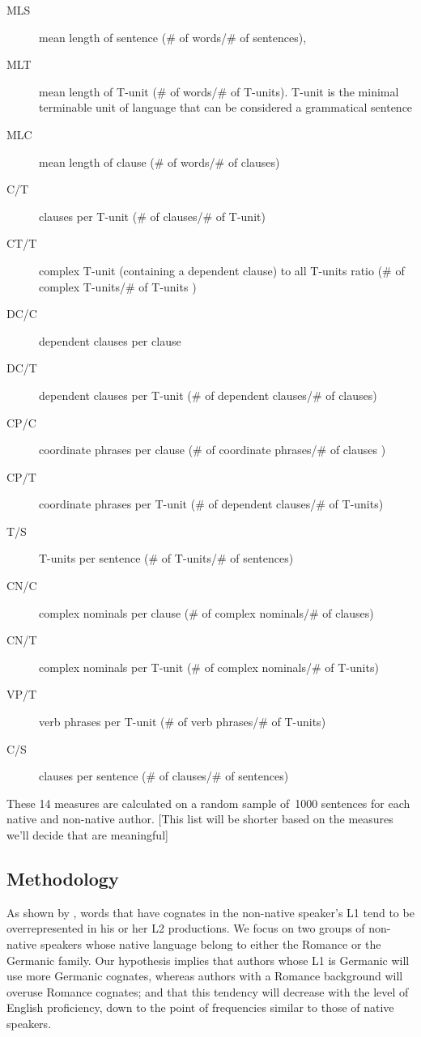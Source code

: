 \documentclass[11pt]{article}
\begin{document}
\begin{description}
\item[MLS] mean length of sentence (\# of words/\# of sentences), 
\item[MLT] mean length of T-unit (\# of words/\# of T-units). T-unit is the minimal terminable unit of language that can be considered a grammatical sentence 
\item[MLC] mean length of clause (\# of words/\# of clauses)
\item[C/T] clauses per T-unit (\# of clauses/\# of T-unit)
\item[CT/T] complex T-unit (containing a dependent clause) to all T-units ratio (\# of complex T-units/\# of T-units )
\item[DC/C] dependent clauses per clause
\item[DC/T] dependent clauses per T-unit (\# of dependent clauses/\# of clauses)
\item[CP/C] coordinate phrases per clause (\# of coordinate phrases/\# of clauses )
\item[CP/T] coordinate phrases per T-unit (\# of dependent clauses/\# of T-units)
\item[T/S] T-units per sentence (\# of T-units/\# of sentences)
\item[CN/C] complex nominals per clause (\# of complex nominals/\# of clauses)
\item[CN/T]  complex nominals per T-unit (\# of complex nominals/\# of T-units)
\item[VP/T] verb phrases per T-unit (\# of verb phrases/\# of T-units)
\item[C/S] clauses per sentence (\# of clauses/\# of sentences)
\end{description}

These 14 measures are calculated on a random sample of~1000 sentences for each native and non-native author. 
[This list will be shorter based on the measures we’ll decide that are meaningful]


\subsection{Methodology}

As shown by \citet{TACL1403}, words that have  cognates in the non-native speaker's L1 tend to be overrepresented in his or her L2 productions. We focus on two groups of non-native speakers whose native language belong to either the Romance or the Germanic family. Our hypothesis implies that authors whose L1 is Germanic will use more Germanic cognates, whereas authors with a Romance background will overuse Romance cognates; and that this tendency will decrease with the level of English proficiency, down to the point of frequencies similar to those of native speakers.
\end{document}
